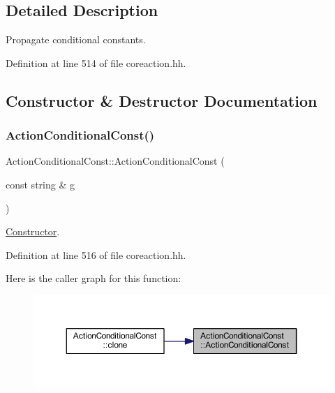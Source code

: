 \subsection{Detailed Description}
Propagate conditional constants. 

Definition at line 514 of file coreaction.\+hh.



\subsection{Constructor \& Destructor Documentation}
\mbox{\label{class_action_conditional_const_add4260c0f90c2baaf341c1e48195dd53}} 
\subsubsection{\texorpdfstring{ActionConditionalConst()}{ActionConditionalConst()}}
{\footnotesize\ttfamily Action\+Conditional\+Const\+::\+Action\+Conditional\+Const (\begin{DoxyParamCaption}\item[{const string \&}]{g }\end{DoxyParamCaption})\hspace{0.3cm}{\ttfamily [inline]}}



\mbox{\hyperlink{class_constructor}{Constructor}}. 



Definition at line 516 of file coreaction.\+hh.

Here is the caller graph for this function\+:
\nopagebreak
\begin{figure}[H]
\begin{center}
\leavevmode
\includegraphics[width=350pt]{class_action_conditional_const_add4260c0f90c2baaf341c1e48195dd53_icgraph}
\end{center}
\end{figure}


